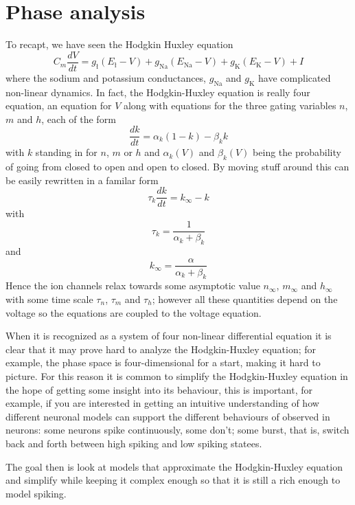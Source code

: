 \documentclass[11pt,a4paper]{scrartcl}
\begin{document}
\section*{Phase analysis}
To recapt, we have seen the Hodgkin Huxley equation
\begin{equation}
C_m\frac{dV}{dt}=g_{\text{\l}}(E_{\text{\l}}-V)+g_{\text{Na}}(E_{\text{Na}}-V)+g_{\text{K}}(E_{\text{K}}-V)+I
\end{equation}
where the sodium and potassium conductances, $g_{\text{Na}}$ and
$g_{\text{K}}$ have complicated non-linear dynamics. In fact, the
Hodgkin-Huxley equation is really four equation, an equation for $V$
along with equations for the three gating variables $n$, $m$ and $h$, each of the form
\begin{equation}
\frac{dk}{dt}=\alpha_k(1-k)-\beta_k k
\end{equation}
with $k$ standing in for $n$, $m$ or $h$ and $\alpha_k(V)$ and $\beta_k(V)$
being the probability of going from closed to open and open to
closed. By moving stuff around this can be easily rewritten in a familar form
\begin{equation}
\tau_k\frac{dk}{dt}=k_\infty - k
\end{equation}
with 
\begin{equation}
\tau_k=\frac{1}{\alpha_k+\beta_k}
\end{equation}
and
\begin{equation}
k_\infty=\frac{\alpha}{\alpha_k+\beta_k}
\end{equation}
Hence the ion channels relax towards some asymptotic value $n_\infty$,
$m_\infty$ and $h_\infty$ with some time scale $\tau_n$, $\tau_m$ and
$\tau_h$; however all these quantities depend on the voltage so the
equations are coupled to the voltage equation.

When it is recognized as a system of four non-linear differential
equation it is clear that it may prove hard to analyze the
Hodgkin-Huxley equation; for example, the phase space is
four-dimensional for a start, making it hard to picture. For this
reason it is common to simplify the Hodgkin-Huxley equation in the
hope of getting some insight into its behaviour, this is important,
for example, if you are interested in getting an intuitive
understanding of how different neuronal models can support the
different behaviours of observed in neurons: some neurons spike
continuously, some don't; some burst, that is, switch back and forth
between high spiking and low spiking statees.

The goal then is look at models that approximate the Hodgkin-Huxley
equation and simplify while keeping it complex enough so that it is
still a rich enough to model spiking.
\end{document}

